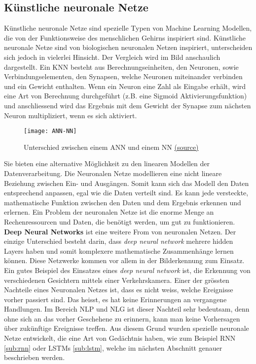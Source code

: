 \subsection{Künstliche neuronale Netze}
\label{sub:neural-nets}
Künstliche neuronale Netze sind spezielle Typen von Machine Learning Modellen, die von der Funktionsweise des
menschlichen Gehirns inspiriert sind. Künstliche neuronale Netze sind von biologischen neuronalen Netzen
inspiriert, unterscheiden sich jedoch in vielerlei Hinsicht. Der Vergleich wird im Bild  anschaulich
dargestellt. Ein \gls{KNN} besteht aus Berechnungseinheiten, den Neuronen, sowie Verbindungselementen,
den Synapsen, welche Neuronen miteinander verbinden und ein Gewicht enthalten. 
\newline
Wenn ein Neuron eine Zahl als Eingabe erhält, wird eine Art von Berechnung durchgeführt (z.B. eine Sigmoid
Aktivierungsfunktion) und anschliessend wird das Ergebnis mit dem Gewicht der Synapse zum nächsten Neuron multipliziert,
wenn es sich \flqq aktiviert\frqq.
\begin{figure}[H]
	\centering
	\texttt{[image: ANN-NN]}
	\caption{Unterschied zwischen einem ANN und einem NN \href{http://www.intechopen.com/source/html/39067/media/image1.png}{(source)}}
	\label{fig:ANN-NN}
\end{figure}
\noindent
Sie bieten eine alternative Möglichkeit zu den linearen Modellen der Datenverarbeitung. Die Neuronalen Netze modellieren
eine nicht lineare Beziehung zwischen Ein- und Ausgängen. Somit kann sich das Modell den Daten entsprechend anpassen,
egal wie die Daten verteilt sind. Es kann jede versteckte, mathematische Funktion zwischen den Daten und dem Ergebnis
erkennen und erlernen. Ein Problem der neuronalen Netze ist die enorme Menge an Rechenressourcen und Daten, die benötigt
werden, um gut zu funktionieren.
\newline
\newline
\textbf{Deep Neural Networks} ist eine weitere From von neuronalen Netzen. Der einzige Unterschied besteht darin, dass
\textit{deep neural network} mehrere hidden Layers haben und somit komplexere mathematische Zusammenhänge lernen
können. Diese Netzwerke kommen vor allem in der Bilderkennung zum Einsatz. Ein gutes Beispiel des Einsatzes eines
\textit{deep neural network} ist, die Erkennung von verschiedenen Gesichtern mittels einer Verkehrskamera. 
\newline
\newline
Einer der grössten Nachteile eines Neuronalen Netzes ist, dass es nicht weiss, welche Ereignisse vorher passiert sind.
Das heisst, es hat keine Erinnerungen an vergangene Handlungen. Im Bereich \gls{NLP} und \gls{NLG} ist dieser Nachteil
sehr bedeutsam, denn ohne sich an das vorher Geschehene zu erinnern, kann man keine Vorhersagen über zukünftige
Ereignisse treffen. Aus diesem Grund wurden spezielle neuronale Netze entwickelt, die eine Art von Gedächtnis haben, wie
zum Beispiel \gls{RNN} \ref{sub:rnn} oder LSTMs \ref{sub:lstm}, welche im nächsten Abschnitt genauer beschrieben werden.

